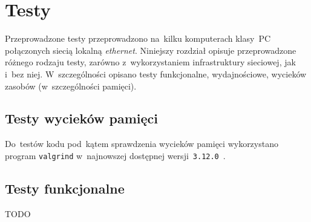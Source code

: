 \documentclass[thesis]{subfiles}
\begin{document}
\chapter{Testy}

Przeprowadzone testy przeprowadzono na~kilku komputerach klasy~PC połączonych siecią lokalną \emph{ethernet}. Niniejszy rozdział opisuje przeprowadzone różnego rodzaju testy, zarówno z~wykorzystaniem infrastruktury sieciowej, jak i~bez niej. W~szczególności opisano testy funkcjonalne, wydajnościowe, wycieków zasobów (w~szczególności pamięci).


\section{Testy wycieków pamięci}

Do~testów kodu pod~kątem sprawdzenia wycieków pamięci wykorzystano program \texttt{valgrind} w~najnowszej dostępnej wersji~\texttt{3.12.0}~\cite{valgrind}.

%
%
%

\section{Testy funkcjonalne}

TODO
\end{document}
